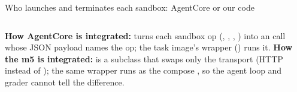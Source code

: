 \begin{frame}{Who launches and terminates each sandbox: AgentCore or our code}
\begin{columns}[T]
\scriptsize\textbf{How AgentCore is integrated:}  turns each sandbox op (, , , ) into an  call whose JSON payload names the op; the task image's wrapper () runs it.
\scriptsize\textbf{How the m5 is integrated:}  is a subclass that swaps only the transport (HTTP instead of ); the same wrapper runs as the compose , so the agent loop and grader cannot tell the difference.
\end{columns}
\end{frame}

